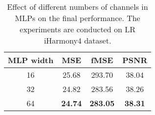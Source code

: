 \documentclass[10pt,journal,twocolumn,twoside]{IEEEtran}
\begin{document}
\begin{table}[!t]
\caption{Demonstration that the HINet does not rely on 3D LUT prediction. The experiments are conducted on LR iHarmony4.}
    \label{tab:LUT}
    \renewcommand{\arraystretch}{0.9} 
    \centering

\end{table}

\begin{table}[t]
\caption{Effect of different numbers of channels in MLPs on the final performance. The experiments are conducted on LR iHarmony4 dataset.}
    \label{tab:MLP width}
\centering
\begin{tabular}{c|ccc}
\hline
MLP width & MSE                       & fMSE                       & PSNR                      \\ \hline
16        & 25.68                     & 293.70                      & 38.04                     \\
32        & \multicolumn{1}{c}{24.82} & \multicolumn{1}{c}{283.56} & \multicolumn{1}{c}{38.26} \\
64        & \textbf{24.74}            & \textbf{283.05}            & \textbf{38.31}            \\ \hline
\end{tabular}
    
\end{table}
\end{document}
